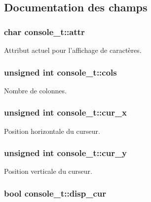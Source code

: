 \subsection{Documentation des champs}
\hypertarget{structconsole__t_a07b1c84ea67ce030ebd868917e56b0d9}{
\subsubsection[{attr}]{\setlength{\rightskip}{0pt plus 5cm}char console\-\_\-t\-::attr}}\label{structconsole__t_a07b1c84ea67ce030ebd868917e56b0d9}
Attribut actuel pour l'affichage de caractères. \hypertarget{structconsole__t_a338612e1f99838e2b34cdb289bc514b8}{
\subsubsection[{cols}]{\setlength{\rightskip}{0pt plus 5cm}unsigned int console\-\_\-t\-::cols}}\label{structconsole__t_a338612e1f99838e2b34cdb289bc514b8}
Nombre de colonnes. \hypertarget{structconsole__t_a296a99289941514aee3b5751d8cd0693}{
\subsubsection[{cur\-\_\-x}]{\setlength{\rightskip}{0pt plus 5cm}unsigned int console\-\_\-t\-::cur\-\_\-x}}\label{structconsole__t_a296a99289941514aee3b5751d8cd0693}
Position horizontale du curseur. \hypertarget{structconsole__t_a3192dab00ef66635ae4897943c47d6ec}{
\subsubsection[{cur\-\_\-y}]{\setlength{\rightskip}{0pt plus 5cm}unsigned int console\-\_\-t\-::cur\-\_\-y}}\label{structconsole__t_a3192dab00ef66635ae4897943c47d6ec}
Position verticale du curseur. \hypertarget{structconsole__t_a6242c03c5b347ed6b0909c1486116bee}{
\subsubsection[{disp\-\_\-cur}]{\setlength{\rightskip}{0pt plus 5cm}bool console\-\_\-t\-::disp\-\_\-cur}}\label{structconsole__t_a6242c03c5b347ed6b0909c1486116bee}
